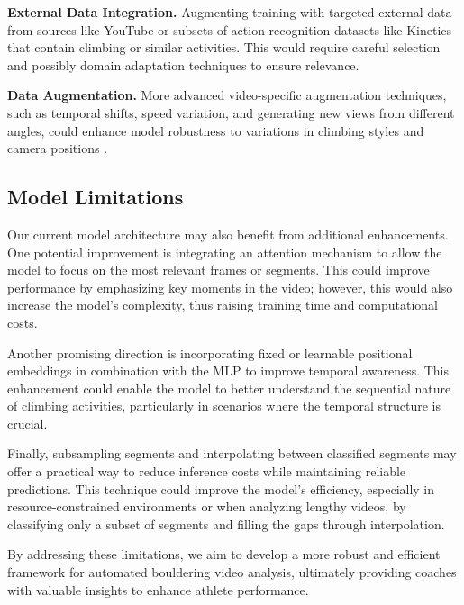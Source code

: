 \noindent\textbf{External Data Integration.}
Augmenting training with targeted external data from sources like YouTube or subsets of action recognition datasets like Kinetics that contain climbing or similar activities. This would require careful selection and possibly domain adaptation techniques to ensure relevance.

\noindent\textbf{Data Augmentation.}  
More advanced video-specific augmentation techniques, such as temporal shifts, speed variation, and generating new views from different angles, could enhance model robustness to variations in climbing styles and camera positions \cite{i3d}.

\subsection{Model Limitations}
Our current model architecture may also benefit from additional enhancements. One potential improvement is integrating an attention mechanism to allow the model to focus on the most relevant frames or segments. This could improve performance by emphasizing key moments in the video; however, this would also increase the model's complexity, thus raising training time and computational costs.

Another promising direction is incorporating fixed or learnable positional embeddings in combination with the MLP to improve temporal awareness. This enhancement could enable the model to better understand the sequential nature of climbing activities, particularly in scenarios where the temporal structure is crucial.

Finally, subsampling segments and interpolating between classified segments may offer a practical way to reduce inference costs while maintaining reliable predictions. This technique could improve the model's efficiency, especially in resource-constrained environments or when analyzing lengthy videos, by classifying only a subset of segments and filling the gaps through interpolation.

By addressing these limitations, we aim to develop a more robust and efficient framework for automated bouldering video analysis, ultimately providing coaches with valuable insights to enhance athlete performance.